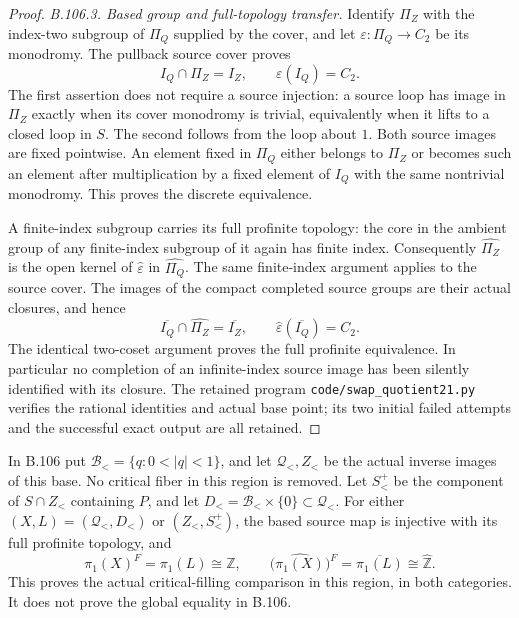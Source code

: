 \begin{proof}
\emph{B.106.3. Based group and full-topology transfer.}
Identify $\Pi_Z$ with the index-two subgroup of $\Pi_Q$ supplied
by the cover, and let $\varepsilon:\Pi_Q\to C_2$ be its monodromy.
The pullback source cover proves
\[
 I_Q\cap\Pi_Z=I_Z,\qquad \varepsilon(I_Q)=C_2.
\]
The first assertion does not require a source injection: a source
loop has image in $\Pi_Z$ exactly when its cover monodromy is
trivial, equivalently when it lifts to a closed loop in $S$.
The second follows from the loop about $1$. Both source images
are fixed pointwise. An element fixed in $\Pi_Q$ either belongs
to $\Pi_Z$ or becomes such an element after multiplication by a
fixed element of $I_Q$ with the same nontrivial monodromy.
This proves the discrete equivalence.

A finite-index subgroup carries its full profinite topology:
the core in the ambient group of any finite-index subgroup of it
again has finite index. Consequently $\widehat{\Pi_Z}$ is the
open kernel of $\widehat\varepsilon$ in $\widehat{\Pi_Q}$.
The same finite-index argument applies to the source cover.
The images of the compact completed source groups are their
actual closures, and hence
\[
 \overline{I_Q}\cap\widehat{\Pi_Z}=\overline{I_Z},
 \qquad \widehat\varepsilon(\overline{I_Q})=C_2.
\]
The identical two-coset argument proves the full profinite
equivalence. In particular no completion of an infinite-index
source image has been silently identified with its closure.
The retained program \texttt{code/swap\_quotient21.py} verifies
the rational identities and actual base point; its two initial
failed attempts and the successful exact output are all retained.
\end{proof}

\label{stmt:B107}
In B.106 put $\mathscr B_< =\{q:0<|q|<1\}$, and let
$\mathscr Q_<,Z_<$ be the actual inverse images of this base.
No critical fiber in this region is removed. Let $S_<^+$ be the
component of $S\cap Z_<$ containing $P$, and let
$D_< =\mathscr B_<\times\{0\}\subset\mathscr Q_<$.
For either $(X,L)=(\mathscr Q_<,D_<)$ or $(Z_<,S_<^+)$,
the based source map is injective with its full profinite topology,
and
\begin{equation}\label{eq:B107-local-fixed}
 \pi_1(X)^F=\pi_1(L)\cong\mathbb Z,
 \qquad
 \bigl(\widehat{\pi_1(X)}\bigr)^F
     =\overline{\pi_1(L)}\cong\widehat{\mathbb Z}.
\end{equation}
This proves the actual critical-filling comparison in this region,
in both categories. It does not prove the global equality in B.106.

